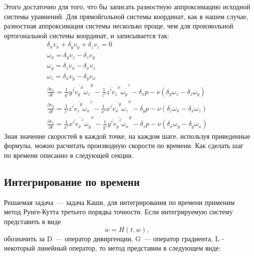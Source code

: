 Этого достаточно для того, что бы записать разностную аппроксимацию исходной системы уравнений. Для прямойгольной системы координат, как в нашем случае, разностная аппроксимация системы несколько проще, чем для произвольной ортогональной системы координат, и записывается так:
\begin{gather}
  \delta_x v_x + \delta_y v_y + \delta_z v_z = 0 
  \\
  \omega_x = \delta_y v_z - \delta_z v_y 
  \\
  \omega_y = \delta_z v_x - \delta_x v_z 
  \\
  \omega_z = \delta_x v_y - \delta_y v_x 
  \\
  \frac{\partial v_x}{\partial t} = \frac{1}{y'}\overline{\overline{y'v_y}^x \omega_z}^y - \frac{1}{z'}\overline{\overline{z'v_z}^x \omega_y}^z - \delta_x p - \nu (\delta_y \omega_z - \delta_z \omega_y)
  \\
  \frac{\partial v_y}{\partial t} = \frac{1}{z'}\overline{\overline{z'v_z}^y \omega_x}^z - \frac{1}{x'}\overline{\overline{x'v_x}^y \omega_z}^x - \delta_y p - \nu (\delta_z \omega_x - \delta_x \omega_z) 
  \\
  \frac{\partial v_z}{\partial t} = \frac{1}{x'}\overline{\overline{x'v_x}^z \omega_y}^x - \frac{1}{y'}\overline{\overline{y'v_y}^z \omega_x}^y - \delta_z p - \nu (\delta_x \omega_y - \delta_y \omega_x)
\end{gather}
Зная значение скоростей в каждой точке, на каждом шаге, используя приведенные формулы, можно расчитать производную скорости по времени. Как сделать шаг по времени описанно в следующей секции. 

\subsection{Интегрирование по времени}

Решаемая задача~--- задача Каши, для интегрирования по времени применим метод Рунге-Кутта третьего порядка точности.
Если интегрируемую систему представить в виде 
$$
	\dot w = H(t,w),
$$
обозначить за D~--- оператор дивиргенции, G~--- оператор градиента, L - некоторый линейный оператор, то метод представим в следующем виде:

